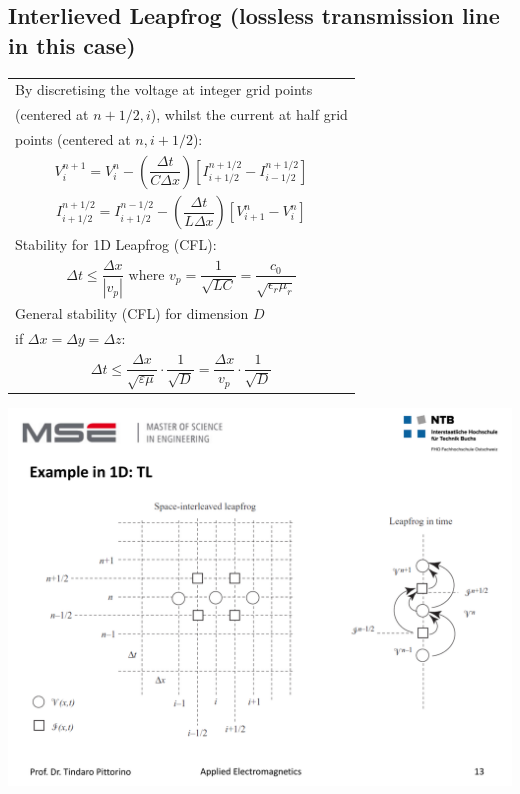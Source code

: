 \subsection{Interlieved Leapfrog (lossless transmission line in this case)}
\begin{minipage}[rt]{9cm}
	\begin{tabular}{l}
		By discretising the voltage at integer grid points\\ (centered at $n+1/2,i$), whilst the current at half grid \\points (centered at $n,i+1/2$): \\
		\begin{equation*}
			V_{i}^{n+1} = V_{i}^{n} - \left(\frac{\Delta t}{C \Delta x}\right) \left[I_{i+1/2}^{n+1/2} - I_{i-1/2}^{n+1/2}\right]
		\end{equation*} \\
		\begin{equation*}
			I_{i+1/2}^{n+1/2} = I_{i+1/2}^{n-1/2} - \left(\frac{\Delta t}{L \Delta x}\right) \left[V_{i+1}^{n} - V_{i}^{n}\right]
		\end{equation*} \\
		Stability for 1D Leapfrog (CFL): \\
		\begin{equation*}
			\Delta t \leq \frac{\Delta x}{|v_p|} \textrm{ where } v_p = \frac{1}{\sqrt{LC}} = \frac{c_0}{\sqrt{\epsilon_r\mu_r}}
		\end{equation*} \\
		General stability (CFL) for dimension $D$ \\if $\Delta x = \Delta y = \Delta z$: \\
		\begin{equation*}
			\Delta t \leq \frac{\Delta x}{\sqrt{\varepsilon \mu}} \cdot \frac{1}{\sqrt{D}} = \frac{\Delta x}{v_p} \cdot \frac{1}{\sqrt{D}}
		\end{equation*}
	\end{tabular}
\end{minipage}
\begin{minipage}[rt]{10cm}
	\includegraphics[width=.95\textwidth]{./images/leapfrog.pdf}
\end{minipage}

